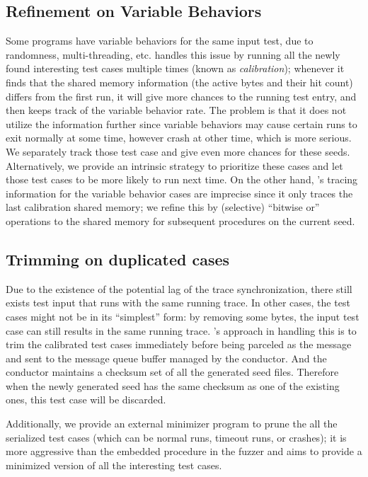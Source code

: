 \subsection{Refinement on Variable Behaviors}\label{sec:entry_var_behavior}

Some programs have variable behaviors for the same input test, due to randomness, multi-threading, etc. {\AFL} handles this issue by running all the newly found interesting test cases multiple times (known as \emph{calibration}); whenever it finds that the shared memory information (the active bytes and their hit count) differs from the first run, it will give more chances to the running test entry, and then keeps track of the variable behavior rate. The problem is that it does not utilize the information further since variable behaviors may cause certain runs to exit normally at some time, however crash at other time, which is more serious. We separately track those test case and give even more chances for these seeds. Alternatively, we provide an intrinsic strategy to prioritize these cases and let those test cases to be more likely to run next time. On the other hand, {\AFL}'s tracing information for the variable behavior cases are imprecise since it only traces the last calibration shared memory; we refine this by (selective) ``bitwise or'' operations to the shared memory for subsequent procedures on the current seed.


 \subsection{Trimming on duplicated cases}
Due to the existence of the potential lag of the trace synchronization, there still exists test input that runs with the same running trace. In other cases, the test cases might not be in its ``simplest'' form: by removing some bytes, the input test case can still results in the same running trace. {\FOT}'s approach in handling this is to trim the calibrated test cases immediately before being parceled as the message and sent to the message queue buffer managed by the conductor. And the conductor maintains a checksum set of all the generated seed files. Therefore when the newly generated seed has the same checksum as one of the existing ones, this test case will be discarded.

Additionally, we provide an external minimizer program to prune the all the serialized test cases (which can be normal runs, timeout runs, or crashes); it is more aggressive than the embedded procedure in the fuzzer and aims to provide a minimized version of all the interesting test cases.
 

